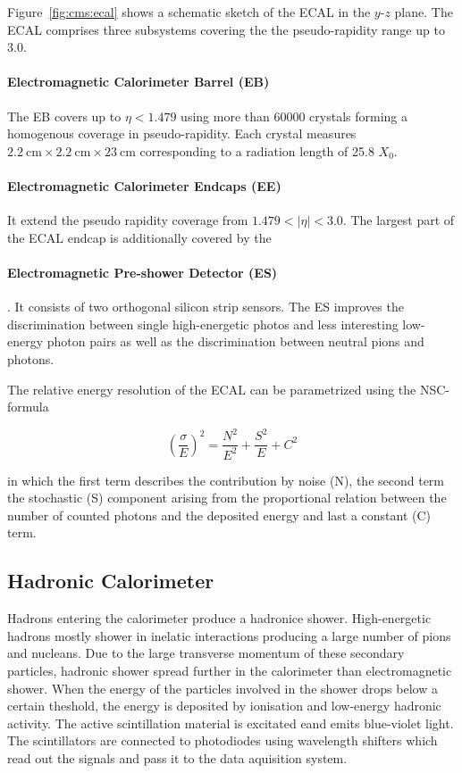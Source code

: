 Figure~\ref{fig:cms:ecal} shows a schematic sketch of the ECAL in the $y$-$z$
plane. The ECAL comprises three subsystems covering the the pseudo-rapidity
range up to 3.0. 

\paragraph{Electromagnetic Calorimeter Barrel (EB)} The EB covers up to $\eta <
1.479$ using more than 60000 crystals forming a homogenous coverage in
pseudo-rapidity. Each crystal measures $\SI{2.2}{\centi\meter} \times
\SI{2.2}{\centi\meter} \times \SI{23}{\centi\meter}$ corresponding to a
radiation length of 25.8 $X_0$.
\paragraph{Electromagnetic Calorimeter Endcaps
(EE)} It extend the pseudo rapidity coverage from $1.479 < |\eta| < 3.0$.  The
largest part of the ECAL endcap is additionally covered by the
\paragraph{Electromagnetic Pre-shower Detector (ES)}. It consists of two orthogonal
silicon strip sensors. The ES improves the discrimination between single
high-energetic photos and less interesting low-energy photon pairs as well as
the discrimination between neutral pions and photons.

The relative energy resolution of the ECAL can be parametrized using the NSC-formula

\begin{equation}
    \left( \frac{\sigma}{E} \right)^2 = \frac{N^2}{E^2} + \frac{S^2}{E} + C^2
\end{equation}

in which the first term describes the contribution by noise (N), the second
term the stochastic (S) component arising from the proportional relation between
the number of counted photons and the deposited energy and last a constant (C)
term.

\subsection{Hadronic Calorimeter}

Hadrons entering the calorimeter produce a hadronice shower. High-energetic
hadrons mostly shower in inelatic interactions producing a large number of pions
and nucleans. Due to the large transverse momentum of these secondary particles,
hadronic shower spread further in the calorimeter than electromagnetic shower.
When the energy of the particles involved in the shower drops below a certain
theshold, the energy is deposited by ionisation and low-energy hadronic
activity. The active scintillation material is excitated eand emits blue-violet
light. The scintillators are connected to photodiodes using wavelength
shifters which read out the signals and pass it to the data aquisition system.


